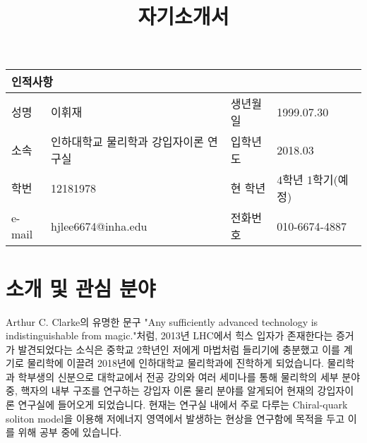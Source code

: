 \documentclass[aps,superscriptaddress,11pt]{revtex4-2}
\begin{document}
\title{자기소개서}
 \maketitle
 \begin{table}[ht]
    \fontsize{8.5}{1}
    \begin{tabular}{|p{1.3cm}|p{5.5cm}|p{1.3cm}|p{5.5cm}|}
    \hline
    \multicolumn{4}{|p{3.5cm}|}{\textbf{\large 인적사항}} \\
    \hline
    \hline
    성명    & 이휘재 & 생년월일     & 1999.07.30 \\
    \hline
    소속    & 인하대학교 물리학과 강입자이론 연구실& 입학년도 & 2018.03 \\
    \hline
    학번    & 12181978 & 현 학년   & 4학년 1학기(예정) \\
    \hline
    e-mail    & hjlee6674@inha.edu & 전화번호 & 010-6674-4887 \\
    \hline
    \end{tabular}
    \end{table}


    
\section{소개 및 관심 분야}\small\noindent
Arthur C. Clarke의 유명한 문구
"Any sufficiently advanced technology is indistinguishable from magic."처럼,
2013년 LHC에서 힉스 입자가 존재한다는 증거가 발견되었다는 소식은 중학교 2학년인
저에게 마법처럼 들리기에 충분했고 이를 계기로 물리학에 이끌려 2018년에 인하대학교 물리학과에 
진학하게 되었습니다. 물리학과 학부생의 신분으로 대학교에서 전공 강의와 여러 세미나를 통해
물리학의 세부 분야 중, 핵자의 내부 구조를 연구하는 강입자 이론 물리 분야를 알게되어
현재의 강입자이론 연구실에 들어오게 되었습니다. 현재는 연구실 내에서 주로 다루는
Chiral-quark soliton model을 이용해 저에너지 영역에서 발생하는 현상을 연구함에 목적을
두고 이를 위해 공부 중에 있습니다.
\end{document}
